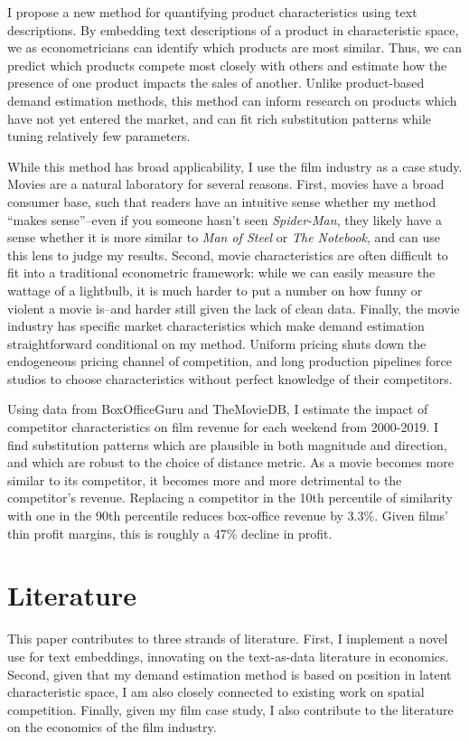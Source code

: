 \documentclass{article}
\begin{document}
I propose a new method for quantifying product characteristics using text descriptions. By embedding text descriptions of a product in characteristic space, we as econometricians can identify which products are most similar. Thus, we can predict which products compete most closely with others and estimate how the presence of one product impacts the sales of another. Unlike product-based demand estimation methods, this method can inform research on products which have not yet entered the market, and can fit rich substitution patterns while tuning relatively few parameters.

While this method has broad applicability, I use the film industry as a case study. Movies are a natural laboratory for several reasons. First, movies have a broad consumer base, such that readers have an intuitive sense whether my method ``makes sense''--even if you someone hasn't seen \emph{Spider-Man}, they likely have a sense whether it is more similar to \emph{Man of Steel} or \emph{The Notebook}, and can use this lens to judge my results. Second, movie characteristics are often difficult to fit into a traditional econometric framework: while we can easily measure the wattage of a lightbulb, it is much harder to put a number on how funny or violent a movie is--and harder still given the lack of clean data. Finally, the movie industry has specific market characteristics which make demand estimation straightforward conditional on my method. Uniform pricing shuts down the endogeneous pricing channel of competition, and long production pipelines force studios to choose characteristics without perfect knowledge of their competitors.

Using data from BoxOfficeGuru and TheMovieDB, I estimate the impact of competitor characteristics on film revenue for each weekend from 2000-2019. I find substitution patterns which are plausible in both magnitude and direction, and which are robust to the choice of distance metric. As a movie becomes more similar to its competitor, it becomes more and more detrimental to the competitor's revenue. Replacing a competitor in the 10th percentile of similarity with one in the 90th percentile reduces box-office revenue by 3.3\%. Given films' thin profit margins, this is roughly a 47\% decline in profit.

\section{Literature}

This paper contributes to three strands of literature. First, I implement a novel use for text embeddings, innovating on the text-as-data literature in economics. Second, given that my demand estimation method is based on position in latent characteristic space, I am also closely connected to existing work on spatial competition. Finally, given my film case study, I also contribute to the literature on the economics of the film industry. 
\end{document}

